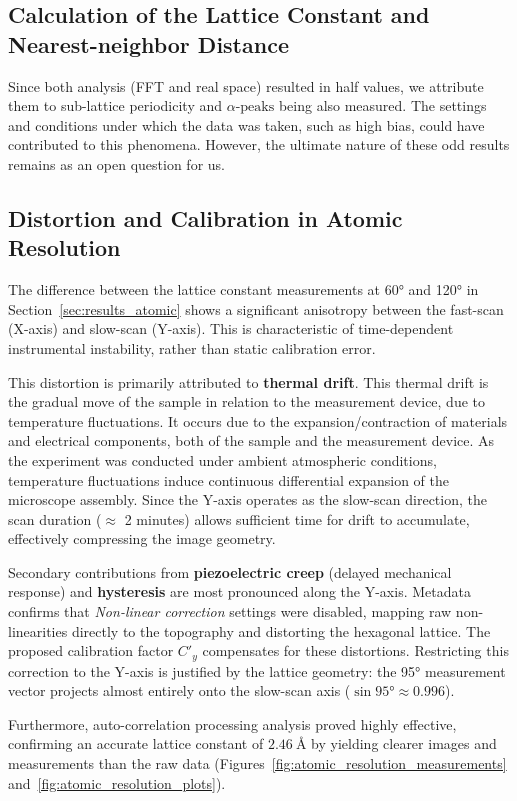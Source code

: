 \documentclass[a4paper]{article}
\begin{document}
\subsection{Calculation of the Lattice Constant and Nearest-neighbor Distance}
Since both analysis (FFT and real space) resulted in half values, we attribute them to sub-lattice periodicity and $\alpha\text{-peaks}$ being also measured. The settings and conditions under which the data was taken, such as high bias, could have contributed to this phenomena. However, the ultimate nature of these odd results remains as an open question for us.

\subsection{Distortion and Calibration in Atomic Resolution}
The difference between the lattice constant measurements at \ang{60} and \ang{120} in Section~\ref{sec:results_atomic} shows a significant anisotropy between the fast-scan (X-axis) and slow-scan (Y-axis). This is characteristic of time-dependent instrumental instability, rather than static calibration error.

This distortion is primarily attributed to \textbf{thermal drift}. This thermal drift is the gradual move of the sample in relation to the measurement device, due to temperature fluctuations. It occurs due to the expansion/contraction of materials and electrical components, both of the sample and the measurement device. As the experiment was conducted under ambient atmospheric conditions, temperature fluctuations induce continuous differential expansion of the microscope assembly. Since the Y-axis operates as the slow-scan direction, the scan duration ($\approx$ 2 minutes) allows sufficient time for drift to accumulate, effectively compressing the image geometry.

Secondary contributions from \textbf{piezoelectric creep} (delayed mechanical response) and \textbf{hysteresis}\cite{hysteresis} are most pronounced along the Y-axis. Metadata confirms that \textit{Non-linear correction} settings were disabled, mapping raw non-linearities directly to the topography and distorting the hexagonal lattice. The proposed calibration factor $C'_{y}$ compensates for these distortions. Restricting this correction to the Y-axis is justified by the lattice geometry: the \ang{95} measurement vector projects almost entirely onto the slow-scan axis ($\sin{95\unit{\degree}}\approx0.996$).

Furthermore, auto-correlation processing analysis proved highly effective, confirming an accurate lattice constant of $\qty{2.46}{\angstrom}$ by yielding clearer images and measurements than the raw data (Figures~\ref{fig:atomic_resolution_measurements} and~\ref{fig:atomic_resolution_plots}).
\end{document}
